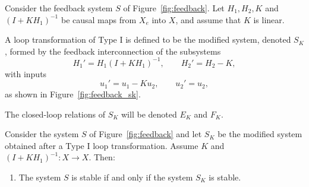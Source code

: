 \begin{definition}
Consider the feedback system $S$ of Figure~\ref{fig:feedback}.  
Let $H_1, H_2, K$ and $(I+KH_1)^{-1}$ be causal maps from $X_e$ into $X$, and assume that $K$ is linear.  

A loop transformation of Type I is defined to be the modified system, denoted $S_K$, formed by the feedback interconnection of the subsystems
\[
H_1' = H_1 (I+KH_1)^{-1}, \qquad H_2' = H_2 - K,
\]
with inputs
\[
u_1' = u_1 - Ku_2, \qquad u_2' = u_2,
\]
as shown in Figure~\ref{fig:feedback_sk}.  

The closed-loop relations of $S_K$ will be denoted $E_K$ and $F_K$.
\end{definition}

\begin{theorem}
Consider the system $S$ of Figure~\ref{fig:feedback} and let $S_K$ be the modified system obtained after a Type I loop transformation. Assume $K$ and $(I+KH_1)^{-1}: X \to X$. Then:
\begin{enumerate}
    \item The system $S$ is stable if and only if the system $S_K$ is stable.
\end{enumerate}
\end{theorem}


